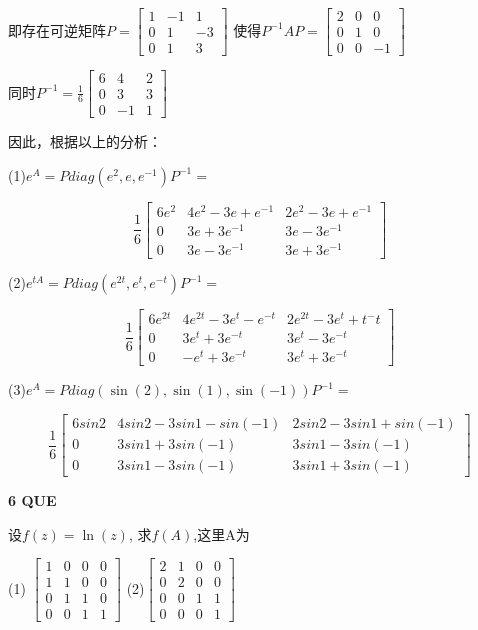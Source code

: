 \documentclass[11pt,letterpaper]{ctexart}
\begin{document}
\begin{enumerate}
即存在可逆矩阵$P = \begin{bmatrix}
	1 & -1 & 1 \\
	0 & 1 & -3 \\
	0 & 1 & 3
\end{bmatrix}$
使得$P^{-1}AP = \begin{bmatrix}
	2 & 0 & 0 \\
	0 & 1 & 0 \\
	0 & 0 & -1 
\end{bmatrix}$


同时$P^{-1} = \frac{1}{6} \begin{bmatrix}
	6 & 4 & 2 \\
	0 & 3 & 3 \\
	0 & -1 & 1
\end{bmatrix}$


因此，根据以上的分析：

(1)$e^A = Pdiag(e^2, e, e^{-1})P^{-1} = $

\[ \frac{1}{6}  \begin{bmatrix}
	6e^2 & 4e^2 - 3e + e^{-1} & 2e^2 - 3e +e^{-1} \\
	0 & 3e +3e^{-1} & 3e -3e^{-1} \\
	0 & 3e -3e^{-1} & 3e + 3e^{-1} 
\end{bmatrix}\]

(2)$e^{tA} = Pdiag(e^{2t}, e^t, e^{-t})P^{-1} = $

\[ \frac{1}{6}  \begin{bmatrix}
	6e^{2t} & 4e^{2t}-3e^t-e^{-t} & 2e^{2t} -3e^t + t^-t \\
	0 & 3e^t +3e^{-t} & 3e^t -3e^{-t} \\
	0 & -e^t + 3e^{-t} & 3e^t + 3e^{-t}
\end{bmatrix}\]

(3)$e^A = Pdiag(\sin(2), \sin(1), \sin(-1))P^{-1} = $

\[ \frac{1}{6}  \begin{bmatrix}
	6sin2 & 4sin2 -3sin1 -sin(-1) & 2sin2 -3sin1 + sin(-1) \\
	0 & 3sin1 + 3sin(-1) & 3sin1 -3sin(-1) \\
	0 & 3sin1 - 3sin(-1) & 3sin1 + 3sin(-1)
\end{bmatrix}\]

\textbf{6 QUE}
\bigskip

设$f(z) = \ln(z)$, 求$f(A)$,这里A为

(1) $\begin{bmatrix}
	1 & 0 & 0 & 0 \\
	1 & 1 & 0 & 0 \\
	0 & 1 & 1 & 0 \\
	0 & 0 & 1 & 1
\end{bmatrix}$
\qquad \qquad (2)$\begin{bmatrix}
	2 & 1 & 0 & 0 \\
	0 & 2 & 0 & 0 \\
	0 & 0 & 1 & 1 \\
	0 & 0 & 0 & 1
\end{bmatrix}$


\end{enumerate}
\end{document}
